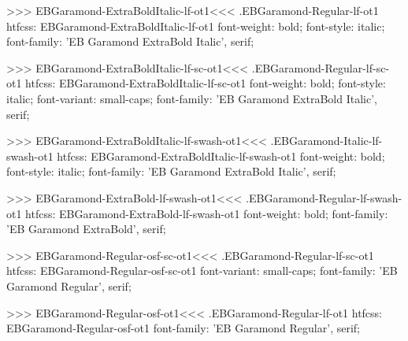 {{{{{{{>>>
\<EBGaramond-ExtraBoldItalic-lf-ot1\><<<
.EBGaramond-Regular-lf-ot1
htfcss:  EBGaramond-ExtraBoldItalic-lf-ot1  font-weight: bold; font-style: italic; font-family: 'EB Garamond ExtraBold Italic', serif;

>>>
\<EBGaramond-ExtraBoldItalic-lf-sc-ot1\><<<
.EBGaramond-Regular-lf-sc-ot1
htfcss:  EBGaramond-ExtraBoldItalic-lf-sc-ot1  font-weight: bold; font-style: italic; font-variant: small-caps; font-family: 'EB Garamond ExtraBold Italic', serif;

>>>
\<EBGaramond-ExtraBoldItalic-lf-swash-ot1\><<<
.EBGaramond-Italic-lf-swash-ot1
htfcss:  EBGaramond-ExtraBoldItalic-lf-swash-ot1  font-weight: bold; font-style: italic; font-family: 'EB Garamond ExtraBold Italic', serif;

>>>
\<EBGaramond-ExtraBold-lf-swash-ot1\><<<
.EBGaramond-Regular-lf-swash-ot1
htfcss:  EBGaramond-ExtraBold-lf-swash-ot1  font-weight: bold; font-family: 'EB Garamond ExtraBold', serif;

>>>
\<EBGaramond-Regular-osf-sc-ot1\><<<
.EBGaramond-Regular-lf-sc-ot1
htfcss:  EBGaramond-Regular-osf-sc-ot1  font-variant: small-caps; font-family: 'EB Garamond Regular', serif;

>>>
\<EBGaramond-Regular-osf-ot1\><<<
.EBGaramond-Regular-lf-ot1
htfcss:  EBGaramond-Regular-osf-ot1  font-family: 'EB Garamond Regular', serif;

}}}}}}}
